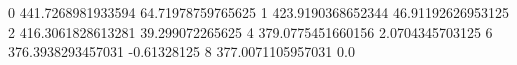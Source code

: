 0 441.7268981933594 64.71978759765625
1 423.9190368652344 46.91192626953125
2 416.3061828613281 39.299072265625
4 379.0775451660156 2.0704345703125
6 376.3938293457031 -0.61328125
8 377.0071105957031 0.0
